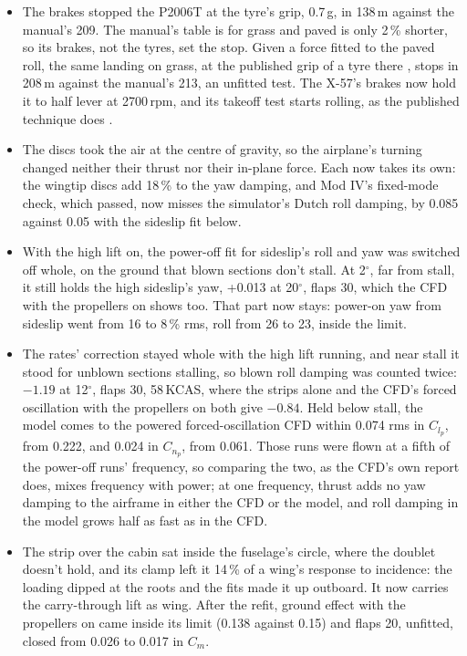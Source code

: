 \documentclass[10pt,a4paper,twocolumn]{article}
\begin{document}
\begin{itemize}
\item The brakes stopped the P2006T at the tyre's grip, 0.7\,g, in 138\,m against the manual's 209. The manual's table is for grass and paved is only 2\,\% shorter, so its brakes, not the tyres, set the stop. Given a force fitted to the paved roll, the same landing on grass, at the published grip of a tyre there \cite{gd}, stops in 208\,m against the manual's 213, an unfitted test. The X-57's brakes now hold it to half lever at 2700\,rpm, and its takeoff test starts rolling, as the published technique does \cite{dt}.
\item The discs took the air at the centre of gravity, so the airplane's turning changed neither their thrust nor their in-plane force. Each now takes its own: the wingtip discs add 18\,\% to the yaw damping, and Mod IV's fixed-mode check, which passed, now misses the simulator's Dutch roll damping, by 0.085 against 0.05 with the sideslip fit below.
\item With the high lift on, the power-off fit for sideslip's roll and yaw was switched off whole, on the ground that blown sections don't stall. At 2$^\circ$, far from stall, it still holds the high sideslip's yaw, +0.013 at 20$^\circ$, flaps 30, which the CFD with the propellers on shows too. That part now stays: power-on yaw from sideslip went from 16 to 8\,\% rms, roll from 26 to 23, inside the limit.
\item The rates' correction stayed whole with the high lift running, and near stall it stood for unblown sections stalling, so blown roll damping was counted twice: $-1.19$ at 12$^\circ$, flaps 30, 58\,KCAS, where the strips alone and the CFD's forced oscillation with the propellers on both give $-0.84$. Held below stall, the model comes to the powered forced-oscillation CFD within 0.074 rms in $C_{l_p}$, from 0.222, and 0.024 in $C_{n_p}$, from 0.061. Those runs were flown at a fifth of the power-off runs' frequency, so comparing the two, as the CFD's own report does, mixes frequency with power; at one frequency, thrust adds no yaw damping to the airframe in either the CFD or the model, and roll damping in the model grows half as fast as in the CFD.
\item The strip over the cabin sat inside the fuselage's circle, where the doublet doesn't hold, and its clamp left it 14\,\% of a wing's response to incidence: the loading dipped at the roots and the fits made it up outboard. It now carries the carry-through lift as wing. After the refit, ground effect with the propellers on came inside its limit (0.138 against 0.15) and flaps 20, unfitted, closed from 0.026 to 0.017 in $C_m$.

\end{itemize}
\end{document}
